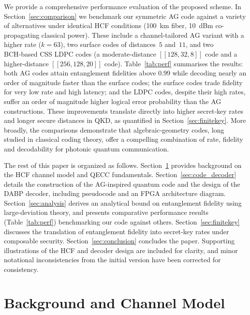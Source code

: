 \documentclass[conference]{IEEEtran}  %
\begin{document}
    We provide a comprehensive performance evaluation of the proposed scheme. In Section~\ref{sec:comparison} we benchmark our symmetric AG code against a variety of alternatives under identical HCF conditions (100~km fiber, 10~dBm co-propagating classical power).  These include a channel‑tailored AG variant with a higher rate ($k=63$), two surface codes of distances~$5$ and~$11$, and two BCH‑based CSS LDPC codes (a moderate-distance $[[128,32,8]]$ code and a higher-distance $[[256,128,20]]$ code).  Table~\ref{tab:perf} summarises the results: both AG codes attain entanglement fidelities above 0.99 while decoding nearly an order of magnitude faster than the surface codes; the surface codes trade fidelity for very low rate and high latency; and the LDPC codes, despite their high rates, suffer an order of magnitude higher logical error probability than the AG constructions.  These improvements translate directly into higher secret‑key rates and longer secure distances in QKD, as quantified in Section~\ref{sec:finitekey}.  More broadly, the comparisons demonstrate that algebraic‑geometry codes, long studied in classical coding theory, offer a compelling combination of rate, fidelity and decodability for photonic quantum communication.

The rest of this paper is organized as follows. Section~\ref{sec:background} provides background on the HCF channel model and QECC fundamentals. Section~\ref{sec:code_decoder} details the construction of the AG-inspired quantum code and the design of the DABP decoder, including pseudocode and an FPGA architecture diagram. Section~\ref{sec:analysis} derives an analytical bound on entanglement fidelity using large-deviation theory, and presents comparative performance results (Table~\ref{tab:perf}) benchmarking our code against others. Section~\ref{sec:finitekey} discusses the translation of entanglement fidelity into secret-key rates under composable security. Section~\ref{sec:conclusion} concludes the paper. Supporting illustrations of the HCF and decoder design are included for clarity, and minor notational inconsistencies from the initial version have been corrected for consistency.

\section{Background and Channel Model}\label{sec:background}
\end{document}

